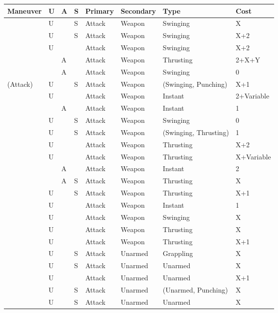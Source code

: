 \documentclass[oneside,11pt,english]{book}
\begin{document}
\begin{longtabu} to 
Maneuver& U &A &S &Primary &Secondary &Type &Cost\\\toprule
{} &U &&S &Attack&Weapon&Swinging& X \\
 &U &&S &Attack&Weapon&Swinging& X+2 \\
 &U&& &Attack&Weapon&Swinging& X+2 \\
 &&A& &Attack&Weapon&Thrusting& 2+X+Y \\
 &&A& &Attack&Weapon&Swinging& 0 \\
 (Attack) &U&& S &Attack&Weapon& (Swinging, Punching) &X+1\\
 &U&& &Attack&Weapon&Instant& 2+Variable\\
 &  &A &  &Attack&Weapon&Instant& 1\\
  &U&&S &Attack&Weapon&Swinging& 0 \\
 &U&&S &Attack&Weapon& (Swinging, Thrusting) &1\\
 &U&& &Attack&Weapon&Thrusting& X+2\\
 &U &&&Attack&Weapon&Thrusting& X+Variable\\
 &&A& &Attack&Weapon&Instant& 2\\
 &&A& S &Attack&Weapon&Thrusting& X \\
 &U&& S &Attack&Weapon&Thrusting& X+1\\
 &U&&&Attack&Weapon&Instant& 1 \\
 &U&& &Attack&Weapon&Swinging& X \\
 &U&& &Attack&Weapon&Thrusting& X \\
 &U&& &Attack&Weapon&Thrusting& X+1 \\
 &U&& S& Attack &Unarmed &Grappling &X\\
 &U&& S &Attack &Unarmed &Unarmed & X \\
 &U &&&Attack &Unarmed &Unarmed & X+1 \\
 &U&&S &Attack &Unarmed &(Unarmed, Punching) &X\\
 & U&&S& Attack &Unarmed &Unarmed & X \\

\end{longtabu}
\end{document}
